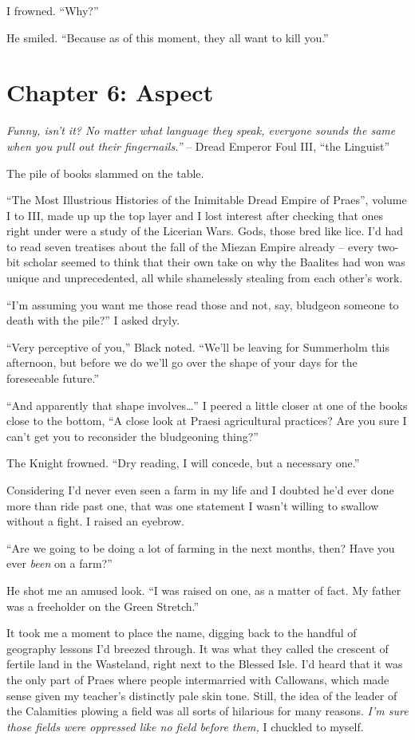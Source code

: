 \documentclass[12pt, openany]{book}
\begin{document}
I frowned. “Why?”

He smiled. “Because as of this moment, they all want to kill you.”
\clearpage
\chapter{Chapter 6: Aspect}

\textit{Funny, isn’t it? No matter what language they speak, everyone sounds the same when you pull out their fingernails.”}
– Dread Emperor Foul III, “the Linguist”

The pile of books slammed on the table.

“The Most Illustrious Histories of the Inimitable Dread Empire of Praes”, volume I to III, made up up the top layer and I lost interest after checking that ones right under were a study of the Licerian Wars. Gods, those bred like lice. I’d had to read seven treatises about the fall of the Miezan Empire already – every two-bit scholar seemed to think that their own take on why the Baalites had won was unique and unprecedented, all while shamelessly stealing from each other’s work.

“I’m assuming you want me those read those and not, say, bludgeon someone to death with the pile?” I asked dryly.

“Very perceptive of you,” Black noted. “We’ll be leaving for Summerholm this afternoon, but before we do we’ll go over the shape of your days for the foreseeable future.”

“And apparently that shape involves…” I peered a little closer at one of the books close to the bottom, “A close look at Praesi agricultural practices? Are you sure I can’t get you to reconsider the bludgeoning thing?”

The Knight frowned. “Dry reading, I will concede, but a necessary one.”

Considering I’d never even seen a farm in my life and I doubted he’d ever done more than ride past one, that was one statement I wasn’t willing to swallow without a fight. I raised an eyebrow.

“Are we going to be doing a lot of farming in the next months, then? Have you ever \textit{been} on a farm?”

He shot me an amused look. “I was raised on one, as a matter of fact. My father was a freeholder on the Green Stretch.”

It took me a moment to place the name, digging back to the handful of geography lessons I’d breezed through. It was what they called the crescent of fertile land in the Wasteland, right next to the Blessed Isle. I’d heard that it was the only part of Praes where people intermarried with Callowans, which made sense given my teacher’s distinctly pale skin tone. Still, the idea of the leader of the Calamities plowing a field was all sorts of hilarious for many reasons. \textit{I’m sure those fields were oppressed like no field before them,} I chuckled to myself.
\end{document}
